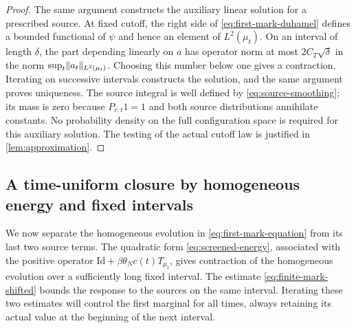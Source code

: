 \documentclass[11pt,reqno]{amsart}
\numberwithin{equation}{section}
\theoremstyle{plain}
\theoremstyle{remark}
\DeclarePairedDelimiter{\norm}{\lVert}{\rVert}
\newcommand{\Id}{\mathrm{Id}}
\begin{document}
\begin{proof}
The same argument constructs the auxiliary linear solution for a prescribed source. At fixed cutoff, the right side of \eqref{eq:first-mark-duhamel} defines a bounded functional of $\psi$ and hence an element of $L^2(\mu_t)$. On an interval of length $\delta$, the part depending linearly on $a$ has operator norm at most $2C_T\sqrt\delta$ in the norm $\sup_t\norm{a_t}_{L^2(\mu_t)}$. Choosing this number below one gives a contraction. Iterating on successive intervals constructs the solution, and the same argument proves uniqueness. The source integral is well defined by \eqref{eq:source-smoothing}; its mass is zero because $P_{r,t}1=1$ and both source distributions annihilate constants. No probability density on the full configuration space is required for this auxiliary solution. The testing of the actual cutoff law is justified in \cref{lem:approximation}.
\end{proof}

\subsection{A time-uniform closure by homogeneous energy and fixed intervals}
We now separate the homogeneous evolution in \eqref{eq:first-mark-equation} from its last two source terms. The quadratic form \eqref{eq:screened-energy}, associated with the positive operator $\Id+\beta\theta_Nc(t)T_{\mu_t}$, gives contraction of the homogeneous evolution over a sufficiently long fixed interval. The estimate \eqref{eq:finite-mark-shifted} bounds the response to the sources on the same interval. Iterating these two estimates will control the first marginal for all times, always retaining its actual value at the beginning of the next interval.
\end{document}
